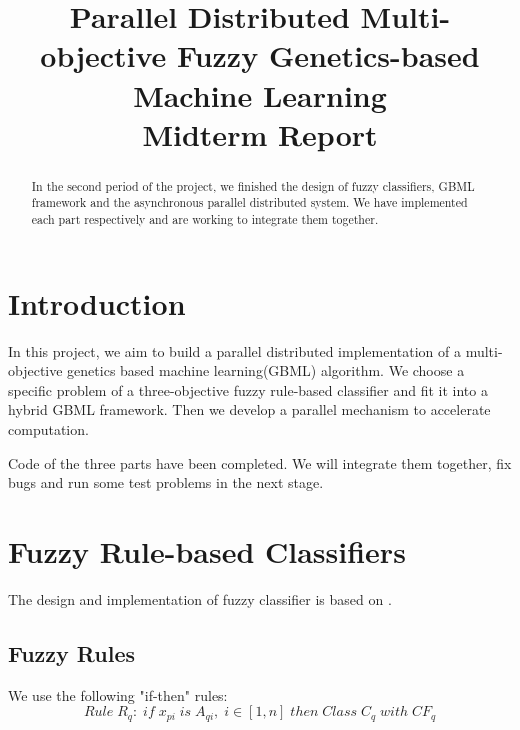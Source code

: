 \documentclass[conference]{IEEEtran}
\begin{document}
  
  \title{Parallel Distributed Multi-objective Fuzzy Genetics-based Machine Learning \\ Midterm Report}
  
  \author{
  }
  
  \maketitle
  
  \begin{abstract}
  In the second period of the project, we finished the design of fuzzy classifiers, GBML framework and the asynchronous parallel distributed system. We have implemented each part respectively and are working to integrate them together.
  \end{abstract}
  \IEEEpeerreviewmaketitle
  
  \section{Introduction}
  In this project, we aim to build a parallel distributed implementation of a multi-objective genetics based machine learning(GBML) algorithm. We choose a specific problem of a three-objective fuzzy rule-based classifier and fit it into a hybrid GBML framework. Then we develop a parallel mechanism to accelerate computation.

  Code of the three parts have been completed. We will integrate them together, fix bugs and run some test problems in the next stage.

  \section{Fuzzy Rule-based Classifiers}
  The design and implementation of fuzzy classifier is based on \cite{ishibuchi2007analysis}.
  \subsection{Fuzzy Rules}
  We use the following "if-then" rules:
  $$Rule\;R_q:\;if\;x_{pi}\;is\;A_{qi},\;i\in [1,n]\;then\;Class\;C_q\;with\;CF_q$$
\end{document}
